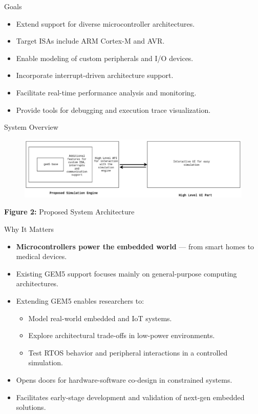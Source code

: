 \begin{frame}{Goals}
  \begin{itemize}
    \item Extend support for diverse microcontroller architectures.
    \item Target ISAs include ARM Cortex-M and AVR.
    \item Enable modeling of custom peripherals and I/O devices.
    \item Incorporate interrupt-driven architecture support.
    \item Facilitate real-time performance analysis and monitoring.
    \item Provide tools for debugging and execution trace visualization.
  \end{itemize}
\end{frame}

\begin{frame}{System Overview}
  \centering
  \begin{figure}
    \includegraphics[width=1.0\textwidth]{images/proposed_system.png}
  \end{figure}
  \textbf{Figure 2: }Proposed System Architecture
\end{frame}

\begin{frame}{Why It Matters}
  \begin{itemize}
    \item \textbf{Microcontrollers power the embedded world} — from smart homes to medical devices.
    \item Existing GEM5 support focuses mainly on general-purpose computing architectures.
    \item Extending GEM5 enables researchers to:
    \begin{itemize}
      \item Model real-world embedded and IoT systems.
      \item Explore architectural trade-offs in low-power environments.
      \item Test RTOS behavior and peripheral interactions in a controlled simulation.
    \end{itemize}
    \item Opens doors for hardware-software co-design in constrained systems.
    \item Facilitates early-stage development and validation of next-gen embedded solutions.
  \end{itemize}
\end{frame}

